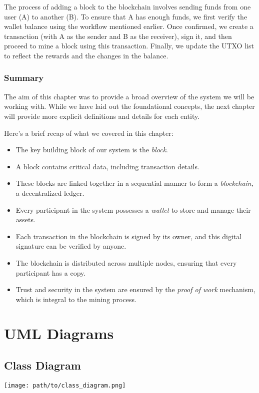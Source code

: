 \documentclass[12pt,a4paper]{report}
\begin{document}
The process of adding a block to the blockchain involves sending funds from one user (A) to another (B). To ensure that A has enough funds, we first verify the wallet balance using the workflow mentioned earlier. Once confirmed, we create a transaction (with A as the sender and B as the receiver), sign it, and then proceed to mine a block using this transaction. Finally, we update the UTXO list to reflect the rewards and the changes in the balance.


\subsection{Summary}

The aim of this chapter was to provide a broad overview of the system we will be working with. While we have laid out the foundational concepts, the next chapter will provide more explicit definitions and details for each entity.

Here’s a brief recap of what we covered in this chapter:

\begin{itemize}
    \item The key building block of our system is the \textit{block}.
    \item A block contains critical data, including transaction details.
    \item These blocks are linked together in a sequential manner to form a \textit{blockchain}, a decentralized ledger.
    \item Every participant in the system possesses a \textit{wallet} to store and manage their assets.
    \item Each transaction in the blockchain is signed by its owner, and this digital signature can be verified by anyone.
    \item The blockchain is distributed across multiple nodes, ensuring that every participant has a copy.
    \item Trust and security in the system are ensured by the \textit{proof of work} mechanism, which is integral to the mining process.
\end{itemize}





\chapter{UML Diagrams}
\section{Class Diagram}
\texttt{[image: path/to/class\_diagram.png]}
\end{document}
